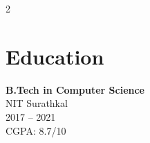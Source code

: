 \documentclass[9pt,a4paper]{article}
\begin{document}
\begin{paracol}{2}
\section{Education}

{\footnotesize
\textbf{B.Tech in Computer Science}\\
NIT Surathkal\\
2017 -- 2021\\
CGPA: 8.7/10
}

\end{paracol}
\end{document}

